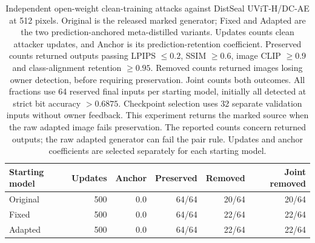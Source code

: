 \begin{table}[ht]\centering\small
\begin{tabular}{lrrrrr}\toprule
Starting model & Updates & Anchor & Preserved & Removed & Joint removed\\\midrule
Original & 500 & 0.0 & 64/64 & 20/64 & 20/64\\
Fixed & 500 & 0.0 & 64/64 & 22/64 & 22/64\\
Adapted & 500 & 0.0 & 64/64 & 22/64 & 22/64\\
\bottomrule\end{tabular}
\caption{Independent open-weight clean-training attacks against DistSeal UViT-H/DC-AE at 512 pixels. Original is the released marked generator; Fixed and Adapted are the two prediction-anchored meta-distilled variants. Updates counts clean attacker updates, and Anchor is its prediction-retention coefficient. Preserved counts returned outputs passing LPIPS $\leq0.2$, SSIM $\geq0.6$, image CLIP $\geq0.9$ and class-alignment retention $\geq0.95$. Removed counts returned images losing owner detection, before requiring preservation. Joint counts both outcomes. All fractions use 64 reserved final inputs per starting model, initially all detected at strict bit accuracy $>0.6875$. Checkpoint selection uses 32 separate validation inputs without owner feedback. This experiment returns the marked source when the raw adapted image fails preservation. The reported counts concern returned outputs; the raw adapted generator can fail the pair rule. Updates and anchor coefficients are selected separately for each starting model.}\end{table}
